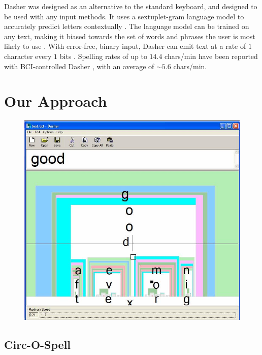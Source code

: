 \documentclass[12pt,titlepage]{article}
\begin{document}
Dasher was designed as an alternative to the standard keyboard, and designed to be used with any input 
methods.  It uses a sextuplet-gram language model to accurately predict letters contextually \cite{mackay_dasherefficient_2003}. The 
language model can be trained on any text, making it biased towards the set of words and phrases the 
user is most likely to use \cite{wills_dasher-efficient_2006}.  With error-free, binary input, Dasher can emit text at a rate of $1$ character 
every $1$ bits \cite{mackay_dasherefficient_2003}.  Spelling rates of up to $14.4$ chars/min have been reported with BCI-controlled Dasher \cite{felton2007neural}, 
with an average of $\sim5.6$ chars/min.

\section{Our Approach}

\begin{figure}[t]
\begin{center}
	\includegraphics[scale=0.25]{figure4.jpeg}
	\label{fig:Dash}
\end{center}
\end{figure}

\subsection{Circ-O-Spell}
\end{document}
